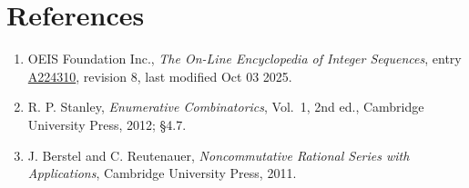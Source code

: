 \documentclass[11pt]{article}
\theoremstyle{definition}
\begin{document}
\section{References}

\begin{enumerate}

\item OEIS Foundation Inc., \emph{The On-Line Encyclopedia of Integer Sequences}, entry \href{https://oeis.org/A224310}{A224310}, revision 8, last modified Oct 03 2025.

\item R. P. Stanley, \emph{Enumerative Combinatorics}, Vol.~1, 2nd ed., Cambridge University Press, 2012; \S4.7.

\item J. Berstel and C. Reutenauer, \emph{Noncommutative Rational Series with Applications}, Cambridge University Press, 2011.

\end{enumerate}
\end{document}

